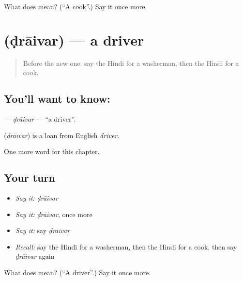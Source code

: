 \begin{tcolorbox}[breakable,colback=teal!4,colframe=teal!35!black,title={Before you move on}]
What does  mean? (\textquotedblleft{}A cook\textquotedblright{}.) Say it once more.
\end{tcolorbox}
\section[\texorpdfstring{\hi{ड्राइवर} (ḍrāivar)}{ड्राइवर (ḍrāivar)}]{ (ḍrāivar) — a driver}

\label{lesson:HI-C194-draivar}



\begin{quote}
Before the new one: say the Hindi for a washerman, then the Hindi for a cook.
\end{quote}

\subsection*{You'll want to know: }
\textbf{} — \emph{ḍrāivar} — \textquotedblleft{}a driver\textquotedblright{}.

\begin{cousinweb}
\textbf{} (\emph{ḍrāivar}) is a loan from English \emph{driver}.
\end{cousinweb}

\begin{grammarlens}[title={What you've built}]
One more word for this chapter.
\end{grammarlens}

\subsection*{Your turn}
\begin{itemize}
\raggedright
  \item \emph{Say it:} \emph{ḍrāivar}
  \item \emph{Say it:} \emph{ḍrāivar}, once more
  \item \emph{Say it:} say \emph{ḍrāivar}
  \item \emph{Recall:} say the Hindi for a washerman, then the Hindi for a cook, then say \emph{ḍrāivar} again
\end{itemize}

\begin{tcolorbox}[breakable,colback=teal!4,colframe=teal!35!black,title={Before you move on}]
What does  mean? (\textquotedblleft{}A driver\textquotedblright{}.) Say it once more.
\end{tcolorbox}

